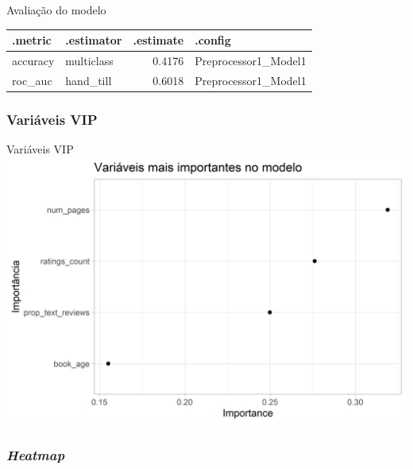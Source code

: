 \documentclass[
  9 pt,
  ignorenonframetext,
]{beamer}
\begin{document}
\begin{frame}[fragile]{Avaliação do modelo}
\begin{table}[H]
\centering
\begin{tabular}{llrl}
\toprule
.metric & .estimator & .estimate & .config\\
\midrule
accuracy & multiclass & 0.4176 & Preprocessor1\_Model1\\
roc\_auc & hand\_till & 0.6018 & Preprocessor1\_Model1\\
\bottomrule
\end{tabular}
\end{table}
\end{frame}

\hypertarget{variuxe1veis-vip}{%
\subsubsection{Variáveis VIP}\label{variuxe1veis-vip}}

\begin{frame}{Variáveis VIP}
\includegraphics{apresentacao_files/figure-beamer/unnamed-chunk-22-1.png}
\end{frame}

\hypertarget{heatmap}{%
\subsubsection{\texorpdfstring{\emph{Heatmap}}{Heatmap}}\label{heatmap}}
\end{document}
